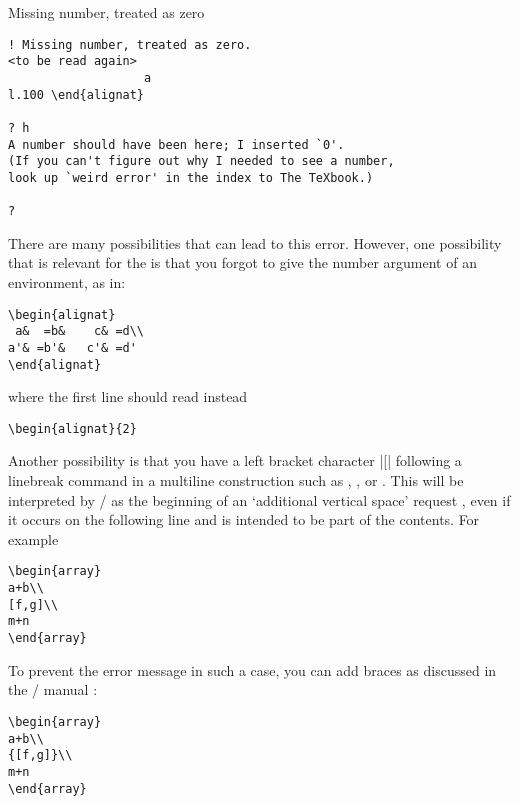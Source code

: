 \documentclass[leqno,titlepage,openany]{amsldoc}
\begin{document}
\begin{error}{Missing number, treated as zero}
\errexa
\begin{verbatim}
! Missing number, treated as zero.
<to be read again>
                   a
l.100 \end{alignat}

? h
A number should have been here; I inserted `0'.
(If you can't figure out why I needed to see a number,
look up `weird error' in the index to The TeXbook.)

?
\end{verbatim}
\errexpl
There are many possibilities that can lead to this error. However, one
possibility that is relevant for the  is that you forgot to
give the number argument of an  environment, as in:
\begin{verbatim}
\begin{alignat}
 a&  =b&    c& =d\\
a'& =b'&   c'& =d'
\end{alignat}
\end{verbatim}
where the first line should read instead
\begin{verbatim}
\begin{alignat}{2}
\end{verbatim}

Another possibility is that you have a left bracket character |[|
following a linebreak command \cn{\\} in a multiline construction such
as , , or . This will be
interpreted by \latex/ as the beginning of an `additional vertical
space' request \cite[\S C.1.6]{lm}, even if it occurs on the following
line and is intended to be part of the contents. For example
\begin{verbatim}
\begin{array}
a+b\\
[f,g]\\
m+n
\end{array}
\end{verbatim}
To prevent the error message in such a case, you can
add braces as discussed in the \latex/ manual \cite[\S C.1.1]{lm}:
\begin{verbatim}
\begin{array}
a+b\\
{[f,g]}\\
m+n
\end{array}
\end{verbatim}

\end{error}
\end{document}
